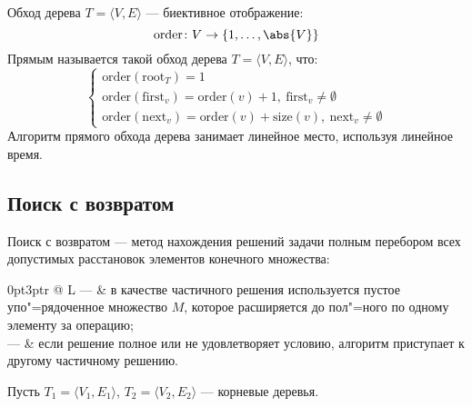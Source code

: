 {\ital Обход} дерева $T=\langle V,E\rangle$ --- биективное отображение:
$$\text{order}\colon V\to\{1,\dots,\abs{V}\}$$
{\ital Прямым} называется такой обход дерева $T=\langle V,E\rangle$, что:
$$\begin{cases}
\text{order}(\text{root}_T)=1\\
\text{order}(\text{first}_v)=\text{order}(v)+1,\ \text{first}_v\neq\emptyset\\
\text{order}(\text{next}_v)=\text{order}(v)+\text{size}(v),\ \text{next}_v\neq\emptyset
\end{cases}$$
Алгоритм прямого обхода дерева занимает линейное место, используя линейное время.

\subsection{Поиск с возвратом}

{\ital Поиск с возвратом} --- метод нахождения решений задачи полным перебором всех допустимых расстановок элементов конечного множества:

\begin{tabularcx}{0pt}{3pt}{r @{ } L}{\textwidth}
--- & в качестве {\ital частичного решения} используется пустое упо"=рядоченное множество $M$, которое расширяется до пол"=ного по одному элементу за операцию;\\
--- & если решение {\ital полное} или {\ital не удовлетворяет условию}, алгоритм приступает к другому частичному решению.
\end{tabularcx}

Пусть $T_1=\langle V_1,E_1\rangle$, $T_2=\langle V_2,E_2\rangle$ --- корневые деревья.

